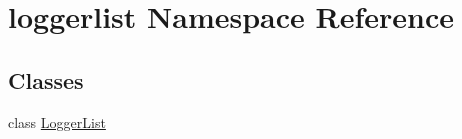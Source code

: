 \hypertarget{namespaceloggerlist}{}\section{loggerlist Namespace Reference}
\label{namespaceloggerlist}
\subsection*{Classes}
\begin{DoxyCompactItemize}
\item 
class \hyperlink{classloggerlist_1_1_logger_list}{Logger\+List}
\end{DoxyCompactItemize}
